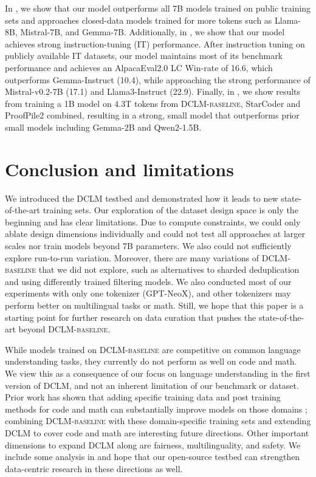 \documentclass{article}
\newcommand{\dclm}{\textsc{DCLM}\xspace}
\newcommand{\hqpool}{\textsc{DCLM-baseline}\xspace}
\newcommand{\llama}{Llama\xspace}
\begin{document}
In , we show that our model outperforms all 7B models trained on public training sets and approaches closed-data models trained for more tokens such as \llama-8B, Mistral-7B, and Gemma-7B. Additionally, in , we show that our model achieves strong instruction-tuning (IT) performance. After instruction tuning on publicly available IT datasets, our model maintains most of its benchmark performance and achieves an AlpacaEval2.0 LC Win-rate of 16.6, which outperforms Gemma-Instruct (10.4), while approaching the strong performance of  Mistral-v0.2-7B (17.1) and Llama3-Instruct (22.9).
Finally, in , we show results from training a 1B model on 4.3T tokens from \hqpool, StarCoder and ProofPile2 combined, resulting in a strong, small model that outperforms prior small models including Gemma-2B and Qwen2-1.5B.




\vspace*{-1mm}
\section{Conclusion and limitations }\label{sec:conclusions}
%

We introduced the \dclm testbed and demonstrated how it leads to new state-of-the-art training sets.
Our exploration of the dataset design space is only the beginning and has clear limitations.
Due to compute constraints, we could only ablate design dimensions individually and could not test all approaches at larger scales nor train models beyond 7B parameters. We also could not sufficiently explore run-to-run variation.
Moreover, there are many variations of \hqpool that we did not explore, such as alternatives to sharded deduplication and using differently trained filtering models.
We also conducted most of our experiments with only one tokenizer (GPT-NeoX), and other tokenizers may perform better on multilingual tasks or math.
Still, we hope that this paper is a starting point for further research on data curation that pushes the state-of-the-art beyond \hqpool.

While models trained on \hqpool are competitive on common language understanding tasks, they currently do not perform as well on code and math.
We view this as a consequence of our focus on language understanding in the first version of DCLM, and not an inherent limitation of our benchmark or dataset.
Prior work has shown that adding specific training data and post training methods for code and math can substantially improve models on those domains \citep{zhong2024achieving, zhang2024accessing, azerbayev2023llemma, li2023starcoder, starcoder2instruct};
combining \hqpool with these domain-specific training sets and extending DCLM to cover code and math are interesting future directions.
Other important dimensions to expand DCLM along are fairness, multilinguality, and safety.
We include some analysis in  and hope that our open-source testbed can strengthen data-centric research in these directions as well.
\end{document}
